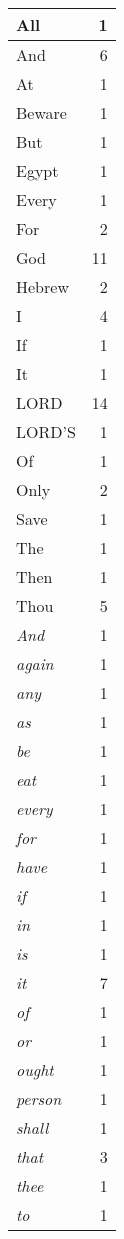 \begin{center}
\begin{longtable}{l|r}
\hline \hline
\endlastfoot
All & 1 \\ \hline
And & 6 \\ \hline
At & 1 \\ \hline
Beware & 1 \\ \hline
But & 1 \\ \hline
Egypt & 1 \\ \hline
Every & 1 \\ \hline
For & 2 \\ \hline
God & 11 \\ \hline
Hebrew & 2 \\ \hline
I & 4 \\ \hline
If & 1 \\ \hline
It & 1 \\ \hline
LORD & 14 \\ \hline
LORD'S & 1 \\ \hline
Of & 1 \\ \hline
Only & 2 \\ \hline
Save & 1 \\ \hline
The & 1 \\ \hline
Then & 1 \\ \hline
Thou & 5 \\ \hline
\emph{And} & 1 \\ \hline
\emph{again} & 1 \\ \hline
\emph{any} & 1 \\ \hline
\emph{as} & 1 \\ \hline
\emph{be} & 1 \\ \hline
\emph{eat} & 1 \\ \hline
\emph{every} & 1 \\ \hline
\emph{for} & 1 \\ \hline
\emph{have} & 1 \\ \hline
\emph{if} & 1 \\ \hline
\emph{in} & 1 \\ \hline
\emph{is} & 1 \\ \hline
\emph{it} & 7 \\ \hline
\emph{of} & 1 \\ \hline
\emph{or} & 1 \\ \hline
\emph{ought} & 1 \\ \hline
\emph{person} & 1 \\ \hline
\emph{shall} & 1 \\ \hline
\emph{that} & 3 \\ \hline
\emph{thee} & 1 \\ \hline
\emph{to} & 1 \\ \hline

\end{longtable}
\end{center}
